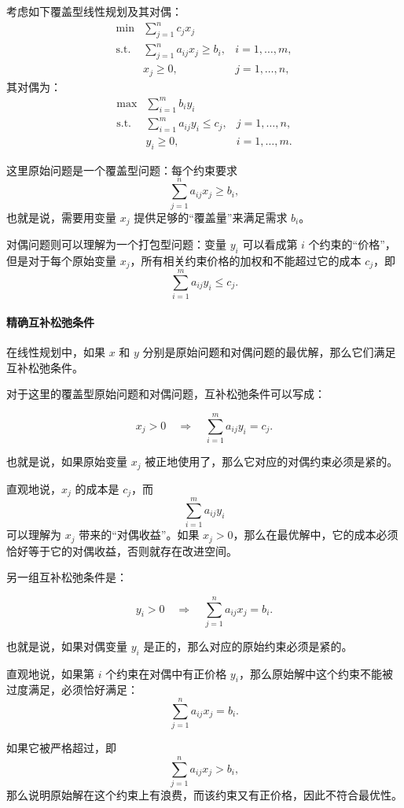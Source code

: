 \documentclass[UTF8,openany,12pt]{ctexbook}
\theoremstyle{remark}
\begin{document}
考虑如下覆盖型线性规划及其对偶：
\[
\begin{array}{rll}
\min & \displaystyle\sum_{j=1}^n c_jx_j\\[2mm]
\text{s.t.} 
& \displaystyle\sum_{j=1}^n a_{ij}x_j\ge b_i, 
& i=1,\dots,m,\\[2mm]
& x_j\ge0,
& j=1,\dots,n,
\end{array}
\]
其对偶为：
\[
\begin{array}{rll}
\max & \displaystyle\sum_{i=1}^m b_iy_i\\[2mm]
\text{s.t.} 
& \displaystyle\sum_{i=1}^m a_{ij}y_i\le c_j, 
& j=1,\dots,n,\\[2mm]
& y_i\ge0,
& i=1,\dots,m.
\end{array}
\]

这里原始问题是一个覆盖型问题：每个约束要求
\[
\sum_{j=1}^n a_{ij}x_j\ge b_i,
\]
也就是说，需要用变量 $x_j$ 提供足够的“覆盖量”来满足需求 $b_i$。

对偶问题则可以理解为一个打包型问题：变量 $y_i$ 可以看成第 $i$ 个约束的“价格”，但是对于每个原始变量 $x_j$，所有相关约束价格的加权和不能超过它的成本 $c_j$，即
\[
\sum_{i=1}^m a_{ij}y_i\le c_j.
\]

\paragraph{精确互补松弛条件}

在线性规划中，如果 $x$ 和 $y$ 分别是原始问题和对偶问题的最优解，那么它们满足互补松弛条件。

对于这里的覆盖型原始问题和对偶问题，互补松弛条件可以写成：

\[
x_j>0
\quad\Longrightarrow\quad
\sum_{i=1}^m a_{ij}y_i=c_j.
\]

也就是说，如果原始变量 $x_j$ 被正地使用了，那么它对应的对偶约束必须是紧的。

直观地说，$x_j$ 的成本是 $c_j$，而
\[
\sum_{i=1}^m a_{ij}y_i
\]
可以理解为 $x_j$ 带来的“对偶收益”。如果 $x_j>0$，那么在最优解中，它的成本必须恰好等于它的对偶收益，否则就存在改进空间。

另一组互补松弛条件是：

\[
y_i>0
\quad\Longrightarrow\quad
\sum_{j=1}^n a_{ij}x_j=b_i.
\]

也就是说，如果对偶变量 $y_i$ 是正的，那么对应的原始约束必须是紧的。

直观地说，如果第 $i$ 个约束在对偶中有正价格 $y_i$，那么原始解中这个约束不能被过度满足，必须恰好满足：
\[
\sum_{j=1}^n a_{ij}x_j=b_i.
\]

如果它被严格超过，即
\[
\sum_{j=1}^n a_{ij}x_j>b_i,
\]
那么说明原始解在这个约束上有浪费，而该约束又有正价格，因此不符合最优性。
\end{document}
